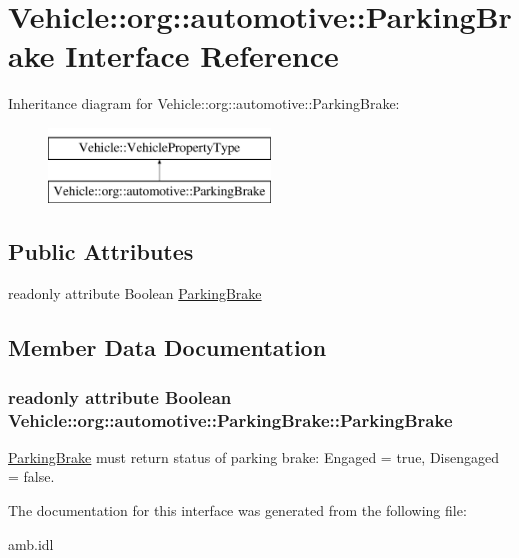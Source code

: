 \hypertarget{interfaceVehicle_1_1org_1_1automotive_1_1ParkingBrake}{\section{Vehicle\-:\-:org\-:\-:automotive\-:\-:Parking\-Brake Interface Reference}
\label{interfaceVehicle_1_1org_1_1automotive_1_1ParkingBrake}
}
Inheritance diagram for Vehicle\-:\-:org\-:\-:automotive\-:\-:Parking\-Brake\-:\begin{figure}[H]
\begin{center}
\leavevmode
\includegraphics[height=2.000000cm]{interfaceVehicle_1_1org_1_1automotive_1_1ParkingBrake}
\end{center}
\end{figure}
\subsection*{Public Attributes}
\begin{DoxyCompactItemize}
\item 
readonly attribute Boolean \hyperlink{interfaceVehicle_1_1org_1_1automotive_1_1ParkingBrake_aed650ab8d36c6c2e03b97114fc86e116}{Parking\-Brake}
\end{DoxyCompactItemize}


\subsection{Member Data Documentation}
\hypertarget{interfaceVehicle_1_1org_1_1automotive_1_1ParkingBrake_aed650ab8d36c6c2e03b97114fc86e116}{
\subsubsection[{Parking\-Brake}]{\setlength{\rightskip}{0pt plus 5cm}readonly attribute Boolean Vehicle\-::org\-::automotive\-::\-Parking\-Brake\-::\-Parking\-Brake}}\label{interfaceVehicle_1_1org_1_1automotive_1_1ParkingBrake_aed650ab8d36c6c2e03b97114fc86e116}
\hyperlink{interfaceVehicle_1_1org_1_1automotive_1_1ParkingBrake}{Parking\-Brake} must return status of parking brake\-: Engaged = true, Disengaged = false. 

The documentation for this interface was generated from the following file\-:\begin{DoxyCompactItemize}
\item 
amb.\-idl\end{DoxyCompactItemize}
